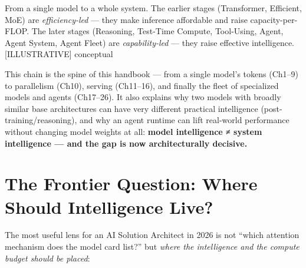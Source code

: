 From a single model to a whole system. The earlier stages (Transformer,
Efficient, MoE) are \emph{efficiency-led} --- they make inference
affordable and raise capacity-per-FLOP. The later stages (Reasoning,
Test-Time Compute, Tool-Using, Agent, Agent System, Agent Fleet) are
\emph{capability-led} --- they raise effective intelligence.
\mbox{{[}ILLUSTRATIVE{]}} conceptual

This chain is the spine of this handbook --- from a single model's
tokens (Ch1--9) to parallelism (Ch10), serving (Ch11--16), and finally
the fleet of specialized models and agents (Ch17--26). It also explains
why two models with broadly similar base architectures can have very
different practical intelligence (post-training/reasoning), and why an
agent runtime can lift real-world performance without changing model
weights at all: \textbf{model intelligence ≠ system intelligence --- and
the gap is now architecturally decisive.}

\section{The Frontier Question: Where Should Intelligence
Live?}\label{the-frontier-question-where-should-intelligence-live}

The most useful lens for an AI Solution Architect in 2026 is not ``which
attention mechanism does the model card list?'' but \emph{where the
intelligence and the compute budget should be placed}:

